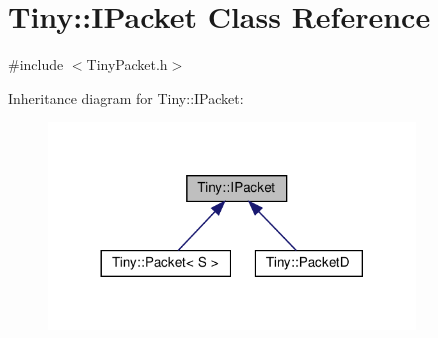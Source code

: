 \hypertarget{classTiny_1_1IPacket}{}\section{Tiny\+:\+:I\+Packet Class Reference}
\label{classTiny_1_1IPacket}


{\ttfamily \#include $<$Tiny\+Packet.\+h$>$}



Inheritance diagram for Tiny\+:\+:I\+Packet\+:\nopagebreak
\begin{figure}[H]
\begin{center}
\leavevmode
\includegraphics[width=276pt]{classTiny_1_1IPacket__inherit__graph}
\end{center}
\end{figure}
